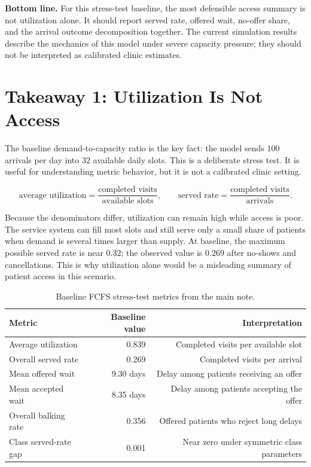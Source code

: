\documentclass[11pt]{article}
\begin{document}
\textbf{Bottom line.} For this stress-test baseline, the most defensible access
summary is not utilization alone. It should report served rate, offered wait,
no-offer share, and the arrival outcome decomposition together. The current
simulation results describe the mechanics of this model under severe capacity
pressure; they should not be interpreted as calibrated clinic estimates.

\newpage

\section{Takeaway 1: Utilization Is Not Access}

The baseline demand-to-capacity ratio is the key fact: the model sends \(100\)
arrivals per day into \(32\) available daily slots. This is a deliberate stress
test. It is useful for understanding metric behavior, but it is not a calibrated
clinic setting.

\[
  \text{average utilization}
  = \frac{\text{completed visits}}{\text{available slots}},
  \qquad
  \text{served rate}
  = \frac{\text{completed visits}}{\text{arrivals}}.
\]

Because the denominators differ, utilization can remain high while access is
poor. The service system can fill most slots and still serve only a small share
of patients when demand is several times larger than supply. At baseline, the
maximum possible served rate is near \(0.32\); the observed value is \(0.269\)
after no-shows and cancellations. This is why utilization alone would be a
misleading summary of patient access in this scenario.

\begin{table}[h]
\centering
\small
\renewcommand{\arraystretch}{1.12}
\begin{tabularx}{0.92\textwidth}{Yrr}
\toprule
Metric & Baseline value & Interpretation \\
\midrule
Average utilization & 0.839 & Completed visits per available slot \\
Overall served rate & 0.269 & Completed visits per arrival \\
Mean offered wait & 9.30 days & Delay among patients receiving an offer \\
Mean accepted wait & 8.35 days & Delay among patients accepting the offer \\
Overall balking rate & 0.356 & Offered patients who reject long delays \\
Class served-rate gap & 0.001 & Near zero under symmetric class parameters \\
\bottomrule
\end{tabularx}
\caption{Baseline FCFS stress-test metrics from the main note.}
\end{table}
\end{document}
